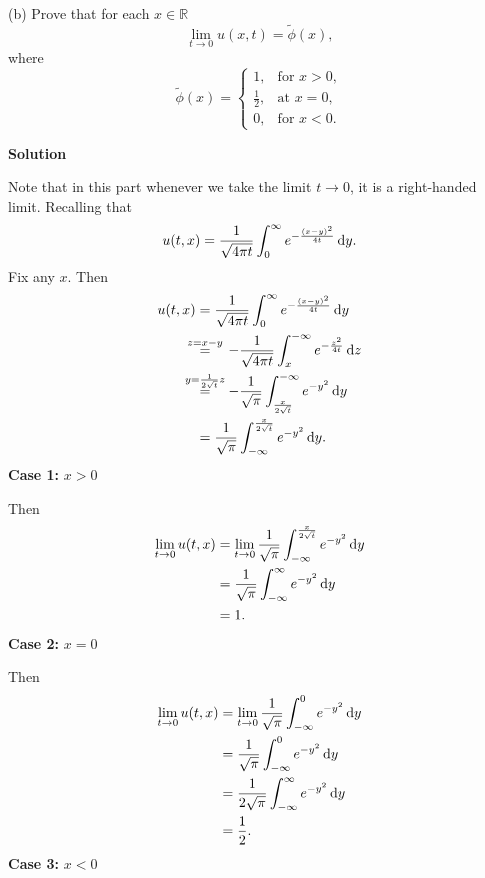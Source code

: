 \documentclass{article}
\begin{document}
\vspace{5mm}

(b) Prove that for each $x \in \mathbb{R}$
%
\begin{equation*}
    \lim_{t \to 0} u(x, t) = \widetilde{\phi}(x)
    ,
\end{equation*}
%
where
%
\begin{equation*}
    \widetilde{\phi}(x) =
        \begin{cases}
            1, & \text{for } x > 0, \\
            \frac{1}{2}, & \text{at } x = 0, \\
            0, & \text{for } x < 0.
        \end{cases}
\end{equation*}

\textbf{Solution}

Note that in this part whenever we take the limit $t \to 0$, it is a
right-handed limit. Recalling that
%
\begin{equation*}
    u(t, x) = \frac{1}{\sqrt{4 \pi t}} \int_0^\infty e^{-\frac{(x - y)^2}{4t }} \dif y
    .
\end{equation*}
%
Fix any $x$. Then
%
\begin{align*}
    u(t, x)
        &= \frac{1}{\sqrt{4 \pi t}} \int_0^\infty e^{-\frac{(x - y)^2}{4t}} \dif y \\
        &\overset{\mathclap{z = x - y}}{=} \quad 
            - \frac{1}{\sqrt{4 \pi t}} \int_x^{-\infty} e^{-\frac{z^2}{4t}} \dif z \\
        &\overset{\mathclap{y = \frac{1}{2 \sqrt{t}} z}}{=} \quad
            - \frac{1}{\sqrt{\pi}} \int_{\frac{x}{2\sqrt{t}}}^{-\infty} e^{-y^2} \dif y \\
        &= \frac{1}{\sqrt{\pi}} \int_{-\infty}^{\frac{x}{2\sqrt{t}}} e^{-y^2} \dif y
        .
\end{align*}
%
\textbf{Case 1:} $x > 0$

Then
%
\begin{align*}
    \lim_{t \to 0} u(t, x)
        &= \lim_{t \to 0} \frac{1}{\sqrt{\pi}} \int_{-\infty}^{\frac{x}{2\sqrt{t}}} e^{-y^2} \dif y \\
        &= \frac{1}{\sqrt{\pi}} \int_{-\infty}^{\infty} e^{-y^2} \dif y \\
        &= 1
        .
\end{align*}
%
\textbf{Case 2:} $x = 0$

Then
%
\begin{align*}
    \lim_{t \to 0} u(t, x)
        &= \lim_{t \to 0} \frac{1}{\sqrt{\pi}} \int_{-\infty}^0 e^{-y^2} \dif y \\
        &= \frac{1}{\sqrt{\pi}} \int_{-\infty}^0 e^{-y^2} \dif y \\
        &= \frac{1}{2 \sqrt{\pi}} \int_{-\infty}^\infty e^{-y^2} \dif y \\
        &= \frac{1}{2}
        .
\end{align*}
%
\textbf{Case 3:} $x < 0$
\end{document}
